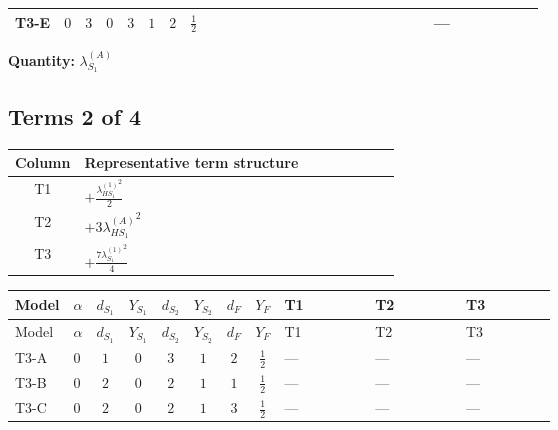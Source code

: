 \documentclass[8pt]{article}
\begin{document}
\begin{landscape}
\begin{longtable}{@{}llcccccc >{\raggedright\arraybackslash}p{0.21\linewidth} >{\raggedright\arraybackslash}p{0.21\linewidth} >{\raggedright\arraybackslash}p{0.21\linewidth}@{}}
\midrule
T3-E & $0$ & $3$ & $0$ & $3$ & $1$ & $2$ & $\frac{1}{2}$ & \scriptsize\adjustbox{max width=\linewidth}{$\begin{gathered} \frac{3 {g_2}^4}{4}\end{gathered}$} & \scriptsize\adjustbox{max width=\linewidth}{$\begin{gathered} +{g_2}^2 (-3 {\lambda_{S_1}^{(1)}}-24 {\lambda_{S_1}^{(A)}})\end{gathered}$} & --- \\
\midrule
\bottomrule
\end{longtable}
\clearpage
\noindent\textbf{Quantity: }$\lambda_{S_1}^{(A)}$\par\smallskip
\subsection*{Terms 2 of 4}
\begin{center}
\begin{tabular}{@{}c >{\raggedright\arraybackslash}p{0.82\linewidth}@{}}
\toprule
Column & Representative term structure \\
\midrule
T1 & \(\displaystyle +\frac{{\lambda_{HS_1}^{(1)}}^2}{2}\) \\
\midrule
T2 & \(\displaystyle +3 {\lambda_{HS_1}^{(A)}}^2\) \\
\midrule
T3 & \(\displaystyle +\frac{7 {\lambda_{S_1}^{(1)}}^2}{4}\) \\
\midrule
\bottomrule
\end{tabular}
\end{center}
\smallskip
\tiny
\begin{longtable}{@{}llcccccc >{\raggedright\arraybackslash}p{0.21\linewidth} >{\raggedright\arraybackslash}p{0.21\linewidth} >{\raggedright\arraybackslash}p{0.21\linewidth}@{}}
\toprule
Model & $\alpha$ & $d_{S_1}$ & $Y_{S_1}$ & $d_{S_2}$ & $Y_{S_2}$ & $d_F$ & $Y_F$ & T1 & T2 & T3 \\
\midrule
\endfirsthead
\toprule
Model & $\alpha$ & $d_{S_1}$ & $Y_{S_1}$ & $d_{S_2}$ & $Y_{S_2}$ & $d_F$ & $Y_F$ & T1 & T2 & T3 \\
\midrule
\endhead
T3-A & $0$ & $1$ & $0$ & $3$ & $1$ & $2$ & $\frac{1}{2}$ & --- & --- & --- \\
\midrule
T3-B & $0$ & $2$ & $0$ & $2$ & $1$ & $1$ & $\frac{1}{2}$ & --- & --- & --- \\
\midrule
T3-C & $0$ & $2$ & $0$ & $2$ & $1$ & $3$ & $\frac{1}{2}$ & --- & --- & --- \\
\midrule

\end{longtable}
\end{landscape}
\end{document}
